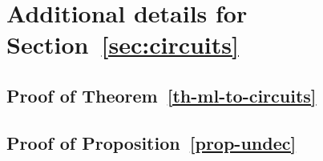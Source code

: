\documentclass[acmsmall,review]{acmart}
\begin{document}



\appendix

\section{Additional details for Section~\ref{sec:circuits}}

% 
%


\subsection{Proof of Theorem~\ref{th-ml-to-circuits}}



\subsection{Proof of Proposition~\ref{prop-undec}}

\end{document}

